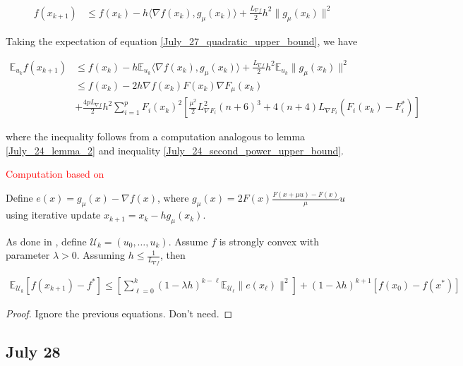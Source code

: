 \documentclass{article}
\begin{document}
\begin{align}
f(x_{k+1}) & \leq f(x_k) - h\langle \nabla f(x_k), g_{\mu}(x_k)\rangle + \frac{L_{\nabla f}}{2}h^2\|g_{\mu}(x_k)\|^2 \label{July_27_quadratic_upper_bound}
\end{align}

Taking the expectation of equation \eqref{July_27_quadratic_upper_bound}, we have 

\begin{align*}
\mathbb{E}_{u_k}f(x_{k+1}) & \leq f(x_k) - h\mathbb{E}_{u_k}\langle \nabla f(x_k), g_{\mu}(x_k)\rangle + \frac{L_{\nabla f}}{2}h^2\mathbb{E}_{u_k}\|g_{\mu}(x_k)\|^2 \\ & \leq f(x_k) -2h \nabla f(x_k)F(x_k)\nabla F_{\mu}(x_k) \\ & + \frac{4pL_{\nabla f}}{2}h^2\sum_{i=1}^pF_i(x_k)^2\left[\frac{\mu^2}{2}L_{\nabla F_i}^2(n+6)^3 + 4(n+4)L_{\nabla F_i}(F_i(x_k)-F_i^*)\right]
\end{align*}

where the inequality follows from a computation analogous to lemma \ref{July_24_lemma_2} and inequality \ref{July_24_second_power_upper_bound}. \newline 

\textcolor{red}{Computation based on \cite{BBN2018}}



\begin{lemma} \label{July_27_lemma}
Define $e(x) = g_{\mu}(x) - \nabla f(x)$, where $g_{\mu}(x) = 2F(x)\frac{F(x+\mu u) - F(x)}{\mu}u$ using iterative update $x_{k+1} = x_k - hg_{\mu}(x_k)$. \newline 

As done in \cite{Nesterov_2015}, define $\mathcal{U}_k = (u_0,\dots,u_k)$. Assume $f$ is strongly convex with parameter $\lambda > 0$. Assuming $h \leq \frac{1}{L_{\nabla f}}$, then

\begin{align}
\mathbb{E}_{\mathcal{U}_k}[f(x_{k+1}) - f^*] \leq \left[\sum_{\ell = 0}^k(1-\lambda h)^{k-\ell}\mathbb{E}_{\mathcal{U}_{\ell}}\|e(x_{\ell})\|^2\right] + (1-\lambda h)^{k+1}[f(x_0)-f(x^*)]
\end{align}

\begin{proof}
Ignore the previous equations. Don't need. 
\end{proof}
\end{lemma}


\subsection{July 28}
\end{document}

